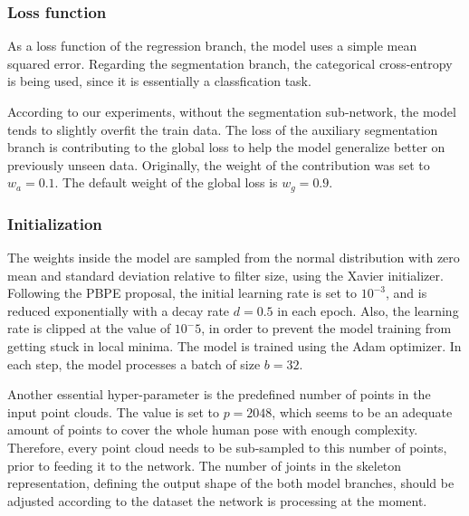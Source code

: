 \subsubsection{Loss function}
As a loss function of the regression branch, the model uses a simple mean squared error. Regarding the segmentation branch, the categorical cross-entropy is being used, since it is essentially a classfication task.\par
\vspace{5mm}
\noindent
According to our experiments, without the segmentation sub-network, the model tends to slightly overfit the train data. The loss of the auxiliary segmentation branch is contributing to the global loss to help the model generalize better on previously unseen data. Originally, the weight of the contribution was set to $w_a=0.1$. The default weight of the global loss is $w_g = 0.9$. 


\subsubsection{Initialization} 
The weights inside the model are sampled from the normal distribution with zero mean and standard deviation relative to filter size, using the Xavier initializer. Following the PBPE proposal, the initial learning rate is set to $10^{-3}$, and is reduced exponentially with a decay rate $d = 0.5$ in each epoch. Also, the learning rate is clipped at the value of $10^-5$, in order to prevent the model training from getting stuck in local minima. The model is trained using the Adam optimizer. In each step, the model processes a batch of size $b=32$.\par
\vspace{5mm}
\noindent Another essential hyper-parameter is the predefined number of points in the input point clouds. The value is set to $p=2048$, which seems to be an adequate amount of points to cover the whole human pose with enough complexity. Therefore, every point cloud needs to be sub-sampled to this number of points, prior to feeding it to the network. The number of joints in the skeleton representation, defining the output shape of the both model branches, should be adjusted according to the dataset the network is processing at the moment.

